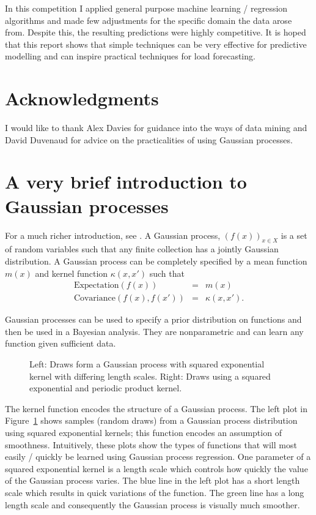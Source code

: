 \documentclass[preprint,authoryear,12pt]{elsarticle}
\begin{document}
In this competition I applied general purpose machine learning / regression algorithms and made few adjustments for the specific domain the data arose from.
Despite this, the resulting predictions were highly competitive.
It is hoped that this report shows that simple techniques can be very effective for predictive modelling and can inspire practical techniques for load forecasting.

\section*{Acknowledgments}

I would like to thank Alex Davies for guidance into the ways of data mining and David Duvenaud for advice on the practicalities of using Gaussian processes.

\appendix

\section{A very brief introduction to Gaussian processes}

\label{sec:gp_appendix}

For a much richer introduction, see \cite{Rasmussen2006}.
A Gaussian process, $(f(x))_{x \in X}$ is a set of random variables such that any finite collection has a jointly Gaussian distribution.
A Gaussian process can be completely specified by a mean function $m(x)$ and kernel function $\kappa (x, x')$ such that
\begin{eqnarray}
\text{Expectation}(f(x)) & = & m(x) \\
\text{Covariance}(f(x), f(x')) & = & \kappa (x, x').
\end{eqnarray}

Gaussian processes can be used to specify a prior distribution on functions and then be used in a Bayesian analysis.
They are nonparametric and can learn any function given sufficient data.

\begin{figure}[ht]
  \begin{center}
    
  \end{center}
  \caption{Left: Draws form a Gaussian process with squared exponential kernel with differing length scales. Right: Draws using a squared exponential and periodic product kernel.}
  \label{fig:gp_samples}
\end{figure}

The kernel function encodes the structure of a Gaussian process.
The left plot in Figure~\ref{fig:gp_samples} shows samples (random draws) from a Gaussian process distribution using squared exponential kernels; this function encodes an assumption of smoothness.
Intuitively, these plots show the types of functions that will most easily / quickly be learned using Gaussian process regression.
One parameter of a squared exponential kernel is a length scale which controls how quickly the value of the Gaussian process varies.
The blue line in the left plot has a short length scale which results in quick variations of the function.
The green line has a long length scale and consequently the Gaussian process is visually much smoother.
\end{document}
